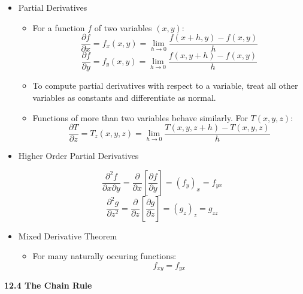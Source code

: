 \documentclass[12pt]{article}
\newcommand{\<}{\left<}
\renewcommand{\>}{\right>}
\newcommand{\p}{\partial}
\begin{document}
\begin{itemize}

  \item Partial Derivatives
    \begin{itemize}
      \item For a function $f$ of two variables $(x,y)$:
        \[\frac{\p f}{\p x}=f_x(x,y)=\lim_{h\to0}\frac{f(x+h,y)-f(x,y)}{h}\]
        \[\frac{\p f}{\p y}=f_y(x,y)=\lim_{h\to0}\frac{f(x,y+h)-f(x,y)}{h}\]
      \item To compute partial derivatives with respect to a variable, treat all other variables as constants and differentiate as normal.
      \item Functions of more than two variables behave similarly. For $T(x,y,z)$:
        \[\frac{\p T}{\p z}=T_z(x,y,z)=\lim_{h\to0}\frac{T(x,y,z+h)-T(x,y,z)}{h}\]
    \end{itemize}
    
  \item Higher Order Partial Derivatives

    \[
      \frac{\p^2 f}{\p x\p y} = \frac{\p}{\p x}\left[ \frac{\p f}{\p y} \right] = (f_y)_x = f_{yx}
    \] 
    \[
      \frac{\p^2 g}{\p z^2}= \frac{\p}{\p z}\left[ \frac{\p g}{\p z} \right]= (g_z)_z=g_{zz}
    \]
  
    \item Mixed Derivative Theorem 
      \begin{itemize}
      \item For many naturally occuring functions:
        \[f_{xy}=f_{yx}\]
      \end{itemize}
  
  

\end{itemize}

\newpage

\centerline{\bf 12.4 The Chain Rule}
\end{document}
